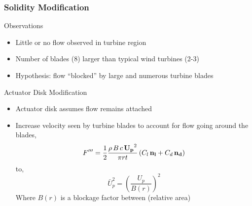 \documentclass[mathserif]{beamer}
\begin{document}
%
%
\begin{frame}
 \frametitle{Solidity Modification}

 \begin{block}{Observations}
   \begin{itemize}
   \item Little or no flow observed in turbine region
   \item Number of blades (8) larger than typical wind turbines (2-3)
   \item Hypothesis: flow ``blocked'' by large and numerous turbine blades
   \end{itemize}
 \end{block}

 \begin{block}{Actuator Disk Modification}
   \begin{itemize}
    \small
    \item Actuator disk assumes flow remains attached 
    \item Increase velocity seen by turbine blades to account for flow
	  going around the blades,
          \begin{equation}
            F''' = \frac{1}{2}\frac{\rho\, B\, c\,
              {\bf U_p}^2}{\pi r t}\left(C_l \, {\bf
				    n_l} + C_d
				    \, {\bf n_d} \right)
          \end{equation}
	  to, 
	  \begin{equation}
	    \bar U_p^{2} = \left(\frac{U_p}{B(r)}\right)^2
	  \end{equation}
	  Where $B(r)$ is a blockage factor between (relative area)
   \end{itemize}
 \end{block}
\end{frame}
\end{document}
